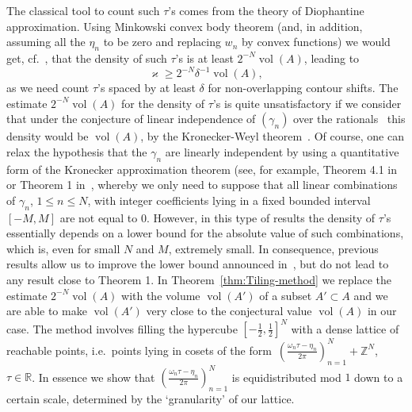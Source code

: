 \documentclass[oneside,english]{amsart}
\numberwithin{equation}{section}
\numberwithin{figure}{section}
\theoremstyle{plain}
\theoremstyle{plain}
\theoremstyle{plain}
\theoremstyle{definition}
\begin{document}
The classical tool to count such $\tau$'s comes from the theory of
Diophantine approximation. Using Minkowski convex body theorem (and,
in addition, assuming all the $\eta_{n}$ to be zero and replacing
$w_{n}$ by convex functions) we would get, cf.~\cite{Montgomery1977},
that the density of such $\tau$'s is at least $2^{-N}\operatorname{vol}(A)$,
leading to
\[
\varkappa\geq2^{-N}\delta^{-1}\operatorname{vol}(A),
\]
as we need count $\tau$'s spaced by at least $\delta$ for non-overlapping
contour shifts. The estimate $2^{-N}\operatorname{vol}(A)$ for the
density of $\tau$'s is quite unsatisfactory if we consider that under
the conjecture of linear independence of $(\gamma_{n})$ over the
rationals~\cite{Wintner1935} this density would be $\operatorname{vol}(A)$,
by the Kronecker-Weyl theorem~\cite[Theorem 1 on p. 359, Appendix, §8]{Karatsuba1992}.
Of course, one can relax the hypothesis that the $\gamma_{n}$ are
linearly independent by using a quantitative form of the Kronecker
approximation theorem (see, for example, Theorem 4.1 in~\cite{GonekMontgomery2016}
or Theorem 1 in~\cite{Chen2000}, whereby we only need to suppose
that all linear combinations of $\gamma_{n}$, $1\leq n\leq N$, with
integer coefficients lying in a fixed bounded interval $[-M,M]$ are
not equal to 0. However, in this type of results the density of $\tau$'s
essentially depends on a lower bound for the absolute value of such
combinations, which is, even for small $N$ and $M$, extremely small.
In consequence, previous results allow us to improve the lower bound
announced in~\cite{Kaczorowski1996}, but do not lead to any result
close to Theorem 1. In Theorem~\ref{thm:Tiling-method} we replace
the estimate $2^{-N}\operatorname{vol}(A)$ with the volume $\operatorname{vol}(A')$
of a subset $A'\subset A$ and we are able to make $\operatorname{vol}(A')$
very close to the conjectural value $\operatorname{vol}(A)$ in our
case. The method involves filling the hypercube $[-\frac{1}{2},\frac{1}{2}]^{N}$
with a dense lattice of reachable points, i.e.~points lying in cosets
of the form~$\left(\frac{\omega_{n}\tau-\eta_{n}}{2\pi}\right)_{n=1}^{N}+\mathbb{Z}^{N}$,
$\tau\in\mathbb{R}$. In essence we show that $\left(\frac{\omega_{n}\tau-\eta_{n}}{2\pi}\right)_{n=1}^{N}$
is equidistributed mod $1$ down to a certain scale, determined by
the `granularity' of our lattice.
\end{document}
